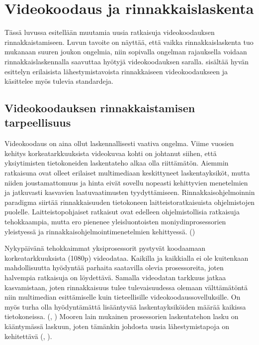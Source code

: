 \section{Videokoodaus ja rinnakkaislaskenta}
\label{chap:parallel_coding}

Tässä luvussa esitellään muutamia uusia ratkaisuja videokoodauksen
rinnakkaistamiseen. Luvun tavoite on näyttää, että vaikka rinnakkaislaskenta
tuo mukanaan suuren joukon ongelmia, niin sopivalla ongelman rajauksella
voidaan rinnakkaislaskennalla saavuttaa hyötyjä videokoodauksen saralla.
\citealt{chi} sisältää hyvän esittelyn erilaisista lähestymistavoista
rinnakkaiseen videokoodaukseen ja käsittelee myös tulevia standardeja.

\subsection{Videokoodauksen rinnakkaistamisen tarpeellisuus}

Videokoodaus on aina ollut laskennallisesti vaativa ongelma. Viime vuosien
kehitys korkeatarkkuuksista videokuvaa kohti on johtanut siihen, että
yksiytimisten tietokoneiden laskentateho alkaa olla riittämätön.
Aiemmin ratkaisuna ovat olleet erilaiset multimediaan keskittyneet
laskentayksiköt, mutta niiden joustamattomuus ja hinta eivät sovellu nopeasti
kehittyvien menetelmien ja jatkuvasti kasvavien laatuvaatimusten tyydyttämiseen.
Rinnakkaisohjelmoinnin paradigma siirtää rinnakkaisuuden tietokoneen
laitteistoratkaisuista ohjelmistojen puolelle. Laitteistopohjaiset ratkaisut
ovat edelleen ohjelmistollisia ratkaisuja tehokkaampia, mutta ero pienenee
yleisluontoisten moniydinprosessorien yleistyessä ja
rinnakkaisohjelmointimenetelmien kehittyessä. (\citealt{choi})

Nykypäivänä tehokkaimmat yksiprosessorit pystyvät koodaamaan
korkeatarkkuuksista (1080p) videodataa. Kaikilla ja kaikkialla ei ole
kuitenkaan mahdollisuutta hyödyntää parhaita saatavilla olevia prosessoreita,
joten halvempia ratkaisuja on löydettävä. Samalla videodatan tarkkuus jatkaa
kasvamistaan, joten rinnakkaisuus tulee tulevaisuudessa olemaan välttämätöntä
niin multimedian esittämiselle kuin tieteellisille videokoodaussovelluksille.
On myös turha olla hyödyntämättä lisääntyvää laskentayksiköiden määrää kaikissa
tietokoneissa. (\citealt{chi}, \citealt{xu}) Mooren lain mukainen prosessorien
laskentatehon lasku on kääntymässä laskuun, joten tämänkin johdosta uusia
lähestymistapoja on kehitettävä (\citealt{moore}, \citealt{vajda}).

